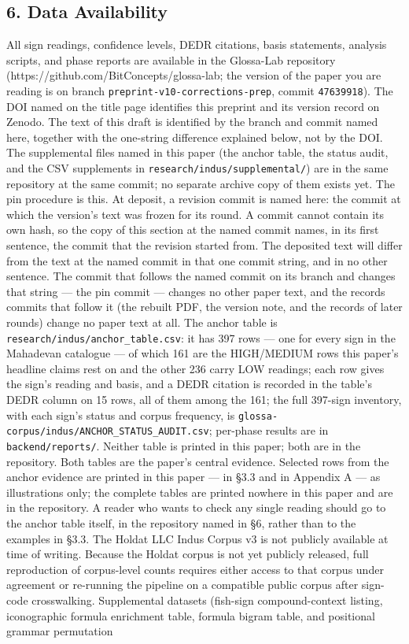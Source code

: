 \documentclass[
]{article}
\begin{document}
\subsection{6. Data Availability}\label{data-availability}

All sign readings, confidence levels, DEDR citations, basis statements, analysis scripts, and phase reports are available in the Glossa-Lab repository (https://github.com/BitConcepts/glossa-lab; the version of the paper you are reading is on branch \texttt{preprint-v10-corrections-prep}, commit \texttt{47639918}). The DOI named on the title page identifies this preprint and its version record on Zenodo. The text of this draft is identified by the branch and commit named here, together with the one-string difference explained below, not by the DOI. The supplemental files named in this paper (the anchor table, the status audit, and the CSV supplements in \texttt{research/indus/supplemental/}) are in the same repository at the same commit; no separate archive copy of them exists yet. The pin procedure is this. At deposit, a revision commit is named here: the commit at which the version's text was frozen for its round. A commit cannot contain its own hash, so the copy of this section at the named commit names, in its first sentence, the commit that the revision started from. The deposited text will differ from the text at the named commit in that one commit string, and in no other sentence. The commit that follows the named commit on its branch and changes that string --- the pin commit --- changes no other paper text, and the records commits that follow it (the rebuilt PDF, the version note, and the records of later rounds) change no paper text at all. The anchor table is \texttt{research/\allowbreak indus/\allowbreak anchor\_table.csv}: it has 397 rows --- one for every sign in the Mahadevan catalogue --- of which 161 are the HIGH/MEDIUM rows this paper's headline claims rest on and the other 236 carry LOW readings; each row gives the sign's reading and basis, and a DEDR citation is recorded in the table's DEDR column on 15 rows, all of them among the 161; the full 397-sign inventory, with each sign's status and corpus frequency, is \texttt{glossa-corpus/\allowbreak indus/\allowbreak ANCHOR\_STATUS\_AUDIT.csv}; per-phase results are in \texttt{backend/\allowbreak reports/}. Neither table is printed in this paper; both are in the repository. Both tables are the paper's central evidence. Selected rows from the anchor evidence are printed in this paper --- in §3.3 and in Appendix A --- as illustrations only; the complete tables are printed nowhere in this paper and are in the repository. A reader who wants to check any single reading should go to the anchor table itself, in the repository named in §6, rather than to the examples in §3.3. The Holdat LLC Indus Corpus v3 is not publicly available at time of writing. Because the Holdat corpus is not yet publicly released, full reproduction of corpus-level counts requires either access to that corpus under agreement or re-running the pipeline on a compatible public corpus after sign-code crosswalking. Supplemental datasets (fish-sign compound-context listing, iconographic formula enrichment table, formula bigram table, and positional grammar permutation 
\end{document}
